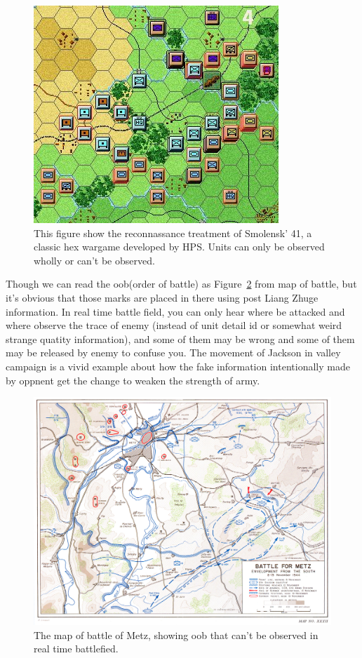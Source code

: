 \documentclass{article}
\begin{document}
\begin{figure}[h]
\includegraphics[width=0.6\linewidth]{SmolenskR4.jpg}
\caption{This figure show the reconnassance treatment of Smolensk' 41, 
a classic hex wargame developed by HPS.
Units can only be observed wholly or can't be observed. }
\label{fig:hps}
\end{figure}

Though we can read the oob(order of battle) as Figure~\ref{fig:metz} from map of battle, 
but it's obvious that those marks are placed in there using post Liang Zhuge information. 
In real time battle field, you can only hear where be attacked and where observe the trace of enemy 
(instead of unit detail id or somewhat weird strange quatity information), 
and some of them may be wrong and some of them may be released by enemy to confuse you.
The movement of Jackson in valley campaign is a vivid example about how the fake information intentionally
made by oppnent get the change to weaken the strength of army.

\begin{figure}[h]
\includegraphics[width=0.6\linewidth]{metz.jpg}
\caption{The map of battle of Metz, showing oob that can't be observed in real time battlefied. }
\label{fig:metz}
\end{figure}
\end{document}
